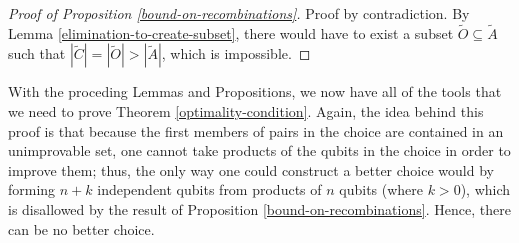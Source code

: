 \documentclass[twocolumn,showpacs,preprintnumbers,amsmath,amssymb,nofootinbib,pra,floatfix]{revtex4-1}
\newenvironment{remark}[1][Remark]{\begin{trivlist}
\item[\hskip \labelsep {\bfseries #1}]}{\end{trivlist}}
\newcommand{\set}{\tilde}
\begin{document}
\begin{proof}[Proof of Proposition \ref{bound-on-recombinations}]
Proof by contradiction.  By Lemma \ref{elimination-to-create-subset}, there would have to exist a subset $\set O\subseteq\set A$ such that $|\set C|=|\set O|>|\set A|$, which is impossible.
\end{proof}
\begin{remark}
With the proceding Lemmas and Propositions, we now have all of the tools that we need to prove Theorem \ref{optimality-condition}.  Again, the idea behind this proof is that because the first members of pairs in the choice are contained in an unimprovable set, one cannot take products of the qubits in the choice in order to improve them;  thus, the only way one could construct a better choice would by forming $n+k$ independent qubits from products of $n$ qubits (where $k>0$), which is disallowed by the result of Proposition \ref{bound-on-recombinations}.  Hence, there can be no better choice.
\end{remark}
\end{document}
